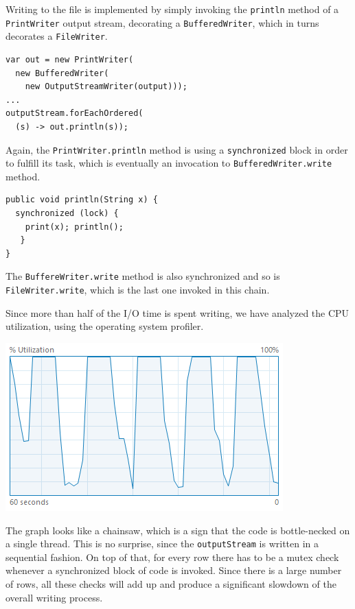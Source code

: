 \documentclass[a4paper,twoside]{article}
\begin{document}
Writing to the file is implemented by simply invoking the {\tt println} method of a {\tt PrintWriter} output stream, decorating a {\tt BufferedWriter}, which in turns decorates a {\tt FileWriter}.
\begin{verbatim}
var out = new PrintWriter(
  new BufferedWriter(
    new OutputStreamWriter(output)));
...    
outputStream.forEachOrdered(
  (s) -> out.println(s));
\end{verbatim}

Again, the {\tt PrintWriter.println} method is using a {\tt synchronized} block in order to fulfill its task, which is eventually an invocation to {\tt BufferedWriter.write} method.
\begin{verbatim}
public void println(String x) {
  synchronized (lock) {
    print(x); println();
   }
}
\end{verbatim}
The {\tt BuffereWriter.write} method is also synchronized and so is {\tt FileWriter.write}, which is the last one invoked in this chain.

Since more than half of the I/O time is spent writing, we have analyzed the CPU utilization, using the operating system profiler.
\begin{center}
\includegraphics[scale=0.5]{images/cpu_original.png}
\end{center}
The graph looks like a chainsaw, which is a sign that the code is bottle-necked on a single thread. This is no surprise, since the {\tt outputStream} is written in a sequential fashion.
On top of that, for every row there has to be a mutex check whenever a synchronized block of code is invoked. Since there is a large number of rows, all these checks will add up and produce a significant slowdown of the overall writing process.
\end{document}
